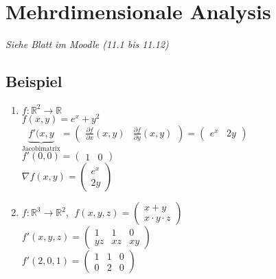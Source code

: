  
\section{Mehrdimensionale Analysis}
\hspace*{0.5cm}
\hspace*{1cm}
\emph{Siehe Blatt im Moodle (11.1 bis 11.12)}


\setcounter{subsection}{12}
\subsection{Beispiel}
\begin{enumerate}
	\item
	$f:\mathbb{R}^2\rightarrow\mathbb{R}$\\
	$f(x,y)=e^x+y^2$\\
	$\underbrace{f'(x,y}_{\text{Jacobimatrix}}=\begin{pmatrix}\frac{\partial f}{\partial x}(x,y) & \frac{\partial f}{\partial y}(x,y)\end{pmatrix}= \begin{pmatrix}e^x & 2y\end{pmatrix}$\\
	$f'(0,0)=\begin{pmatrix}1 & 0\end{pmatrix}$\\
	$\nabla f(x,y)=\begin{pmatrix}e^x \\ 2y\end{pmatrix}$
	
	\item
	$f:\mathbb{R}^3\rightarrow \mathbb{R}^2, \ \ f(x,y,z)=\begin{pmatrix}x+y \\ x\cdot y\cdot z\end{pmatrix}$\\
	$f'(x,y,z)=\begin{pmatrix}1 & 1 & 0 \\ yz & xz & xy\end{pmatrix}$\\
	$f'(2,0,1)=\begin{pmatrix}1 & 1 & 0 \\ 0 &  2 & 0 \end{pmatrix}$
\end{enumerate}

